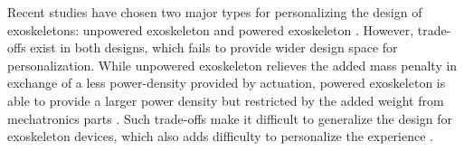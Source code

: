 \documentclass{article}
\begin{document}
    
    

    
    

    


Recent studies have chosen two major types for personalizing the design of exoskeletons: unpowered exoskeleton \cite{UnpoweredExo} and powered exoskeleton \cite{OSL2020}. However, trade-offs exist in both designs, which fails to provide wider design space for personalization. While unpowered exoskeleton relieves the added mass penalty in exchange of a less power-density provided by actuation, powered exoskeleton is able to provide a larger power density but restricted by the added weight from mechatronics parts \cite{tetheredExoBenefits}. Such trade-offs make it difficult to generalize the design for exoskeleton devices, which also adds difficulty to personalize the experience \cite{ProsthesisOverview}. 
    
\end{document}
